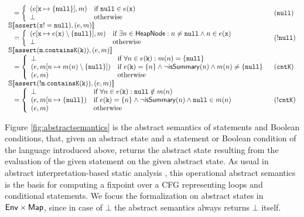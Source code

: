 \begin{figure*}[t]
\[\begin{array}{ll}
\;\;\;= \left\{
\begin{array}{ll}
(e[\mathtt{x} \mapsto \{\mathtt{null}\}], m) & \textrm{if } \mathtt{null} \in e(\mathtt{x})\\
\bot & \textrm{otherwise}\\
\end{array}
\right. & (\mathtt{null})\\
\mathbb{S}\llbracket \mathtt{assert(x!=null)}, (e, m) \rrbracket \\
\;\;\;=\left\{
\begin{array}{ll}
(e[\mathtt{x} \mapsto e(\mathtt{x}) \setminus \{\mathtt{null}\}], m) & \textrm{if } \exists n \in \mathsf{HeapNode} : n \neq \mathtt{null} \land n \in e(\mathtt{x})\\
\bot & \textrm{otherwise}\\
\end{array}
\right. & (\mathtt{!null})\\
\mathbb{S}\llbracket \mathtt{assert(m.containsK(k))}, (e, m) \rrbracket\\
\;\;\;= \left\{
\begin{array}{ll}
\bot & \textrm{if } \forall n \in e(\mathtt{k}) : m(n)=\{\mathtt{null}\}\\
(e, m[n \mapsto m(n)\setminus\{\mathtt{null}\}]) & \textrm{if } e(\mathtt{k}) = \{n\} \land \neg \mathsf{isSummary}(n) \land  m(n) \neq \{\mathtt{null}\}\\
(e, m) & \textrm{otherwise}\\
\end{array}
\right. & (\mathtt{cntK})\\
\mathbb{S}\llbracket \mathtt{assert(!m.containsK(k))}, (e, m) \rrbracket\\
\;\;\;= \left\{
\begin{array}{ll}
\bot & \textrm{if } \forall n \in e(\mathtt{k}) : \mathtt{null} \notin m(n)\\
(e, m[n \mapsto \{\mathtt{null}\}) & \textrm{if } e(\mathtt{k}) = \{n\} \land \neg \mathsf{isSummary}(n) \land \mathtt{null} \in m(n)\\
(e, m) & \textrm{otherwise}\\
\end{array}
\right. & (\mathtt{!cntK})\\
\end{array}
\]
\caption{Formal definition of the abstract semantics.}
\label{fig:abstractsemantics}
\end{figure*}

Figure \ref{fig:abstractsemantics} is the abstract semantics of statements and Boolean conditions, that, given an abstract state and a statement or Boolean condition of the language introduced above, returns the abstract state resulting from the evaluation of the given statement on the given abstract state.
As usual in abstract interpretation-based static analysis \cite{CC77}, this operational abstract semantics is the basis for computing a fixpoint over a CFG representing loops and conditional statements.
We focus the formalization on abstract states in $\mathsf{Env} \times \mathsf{Map}$, since in case of $\bot$ the abstract semantics always returns $\bot$ itself.

